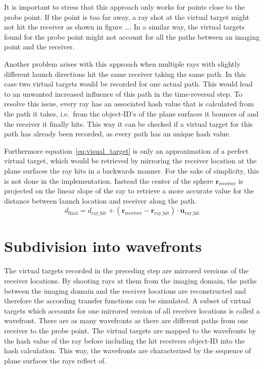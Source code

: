 It is important to stress that this approach only works for points close to the probe point.
If the point is too far away, a ray shot at the virtual target might not hit the receiver as shown in figure \ldots.
In a similar way, the virtual targets found for the probe point might not account for all the paths between an imaging point and the receiver.

Another problem arises with this approach when multiple rays with slightly different launch directions hit the same receiver taking the same path.
In this case two virtual targets would be recorded for one actual path.
This would lead to an unwanted increased influence of this path in the time-reversal step.
To resolve this issue, every ray has an associated hash value that is calculated from the path it takes, i.e.~from the object-ID's of the plane surfaces it bounces of and the receiver it finally hits.
This way it can be checked if a virtual target for this path has already been recorded, as every path has an unique hash value.

Furthermore equation~\eqref{eq:visual_target} is only an approximation of a perfect virtual target, which would be retrieved by mirroring the receiver location at the plane surfaces the ray hits in a backwards manner.
For the sake of simplicity, this is not done in the implementation.
Instead the center of the sphere \(\mathbf{r}_{\text{receiver}}\) is projected on the linear slope of the ray to retrieve a more accurate value for the distance between launch location and receiver along the path.
\begin{equation}
    d_{\text{final}} = d_{\text{ray\_hit}} +  (\mathbf{r}_{\text{receiver}} - \mathbf{r}_{\text{ray\_hit}}) \cdot \mathbf{u}_{\text{ray\_hit}}
\end{equation}

\section{Subdivision into wavefronts}\label{section:subdivision_into_wavefronts}

The virtual targets recorded in the preceding step are mirrored versions of the receiver locations.
By shooting rays at them from the imaging domain, the paths between the imaging domain and the receiver locations are reconstructed and therefore the according transfer functions can be simulated.
A subset of virtual targets which accounts for one mirrored version of all receiver locations is called a wavefront.
There are as many wavefronts as there are different paths from one receiver to the probe point.
The virtual targets are mapped to the wavefronts by the hash value of the ray before including the hit receivers object-ID into the hash calculation.
This way, the wavefronts are characterized by the sequence of plane surfaces the rays reflect of.
